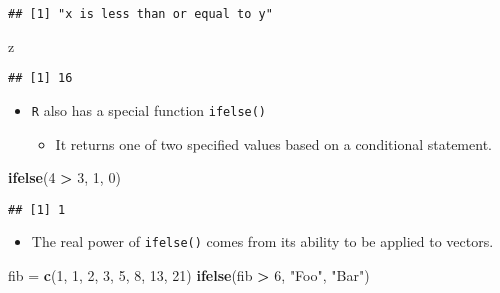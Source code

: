 \documentclass[]{book}
\newenvironment{Shaded}{\begin{snugshade}}{\end{snugshade}}
\newcommand{\DecValTok}[1]{\textcolor[rgb]{0.00,0.00,0.81}{#1}}
\newcommand{\KeywordTok}[1]{\textcolor[rgb]{0.13,0.29,0.53}{\textbf{#1}}}
\newcommand{\NormalTok}[1]{#1}
\newcommand{\OperatorTok}[1]{\textcolor[rgb]{0.81,0.36,0.00}{\textbf{#1}}}
\newcommand{\StringTok}[1]{\textcolor[rgb]{0.31,0.60,0.02}{#1}}
\providecommand{\tightlist}{%
  \setlength{\itemsep}{0pt}\setlength{\parskip}{0pt}}
\begin{document}
\begin{verbatim}
## [1] "x is less than or equal to y"
\end{verbatim}

\begin{Shaded}
\begin{Highlighting}[]
\NormalTok{z}
\end{Highlighting}
\end{Shaded}

\begin{verbatim}
## [1] 16
\end{verbatim}

\begin{itemize}
\tightlist
\item
  \texttt{R} also has a special function \texttt{ifelse()}

  \begin{itemize}
  \tightlist
  \item
    It returns one of two specified values based on a conditional statement.
  \end{itemize}
\end{itemize}

\begin{Shaded}
\begin{Highlighting}[]
\KeywordTok{ifelse}\NormalTok{(}\DecValTok{4} \OperatorTok{>}\StringTok{ }\DecValTok{3}\NormalTok{, }\DecValTok{1}\NormalTok{, }\DecValTok{0}\NormalTok{)}
\end{Highlighting}
\end{Shaded}

\begin{verbatim}
## [1] 1
\end{verbatim}

\begin{itemize}
\tightlist
\item
  The real power of \texttt{ifelse()} comes from its ability to be applied to vectors.
\end{itemize}

\begin{Shaded}
\begin{Highlighting}[]
\NormalTok{fib =}\StringTok{ }\KeywordTok{c}\NormalTok{(}\DecValTok{1}\NormalTok{, }\DecValTok{1}\NormalTok{, }\DecValTok{2}\NormalTok{, }\DecValTok{3}\NormalTok{, }\DecValTok{5}\NormalTok{, }\DecValTok{8}\NormalTok{, }\DecValTok{13}\NormalTok{, }\DecValTok{21}\NormalTok{)}
\KeywordTok{ifelse}\NormalTok{(fib }\OperatorTok{>}\StringTok{ }\DecValTok{6}\NormalTok{, }\StringTok{"Foo"}\NormalTok{, }\StringTok{"Bar"}\NormalTok{)}
\end{Highlighting}
\end{Shaded}
\end{document}
